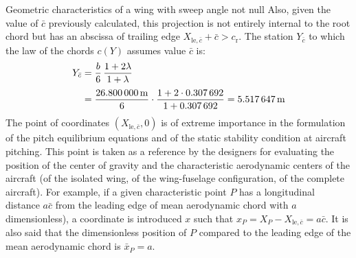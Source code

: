 \documentclass[[12pt,twoside]{book}
\begin{document}
\begin{myExampleX}{Geometric characteristics of a wing with sweep angle not null}{}
Also, given the value of $\bar{c}$ previously calculated, this projection
is not entirely internal to the root chord but has an abscissa of trailing edge $X_{\mathrm{le},\bar{c}}+\bar{c}>c_\mathrm{r}$.
The station $Y_{\bar{c}}$ to which the law of the chords $c(Y)$ assumes value $\bar{c}$ is:
\[
\begin{split}
Y_{\bar{c}} 
  & {}=
    \frac{b}{6} \, \frac{1+2\lambda}{1+\lambda} \\[3pt]
  & {}=
    \frac{\SI[round-precision=1]{\mySpanWingMT}{\metre}}{6}
      \cdot 
      \frac{
        1 + 2\cdot\SI[round-precision=2]{\myTaperRatioWing}{}
      }{
        1 + \SI[round-precision=2]{\myTaperRatioWing}{}
      }
    =  \SI[round-precision=2]{\myYMACWingMT}{\metre} 
\end{split}
\]
The point of coordinates $(X_{\mathrm{le},\bar{c}},0)$ is of extreme importance in the formulation of the pitch equilibrium equations and of the static stability condition at aircraft pitching. This point is taken as a reference by the designers for evaluating the position of the center of gravity and the characteristic aerodynamic centers of the aircraft
(of the isolated wing, of the wing-fuselage configuration, of the complete aircraft). For example, if a given characteristic point $P$ has a longitudinal distance $a\bar{c}$ from the leading edge of mean aerodynamic chord with $a$ dimensionless), a coordinate is introduced $x$ such that $x_P = X_P - X_{\mathrm{le},\bar{c}} = a\bar{c}$. It is also said that the dimensionless position of $P$ compared to the leading edge of the mean
aerodynamic chord is $\bar{x}_P=a$.
\end{myExampleX}
\end{document}
